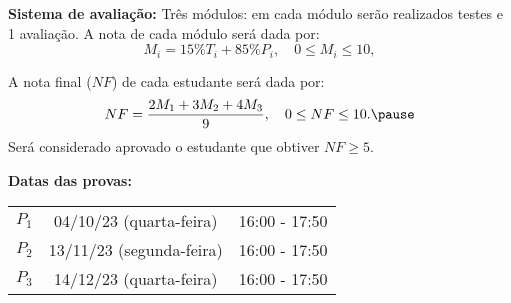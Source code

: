 \documentclass{beamer}
\begin{document}
    \begin{frame}
        {\bf{Sistema de avaliação:}} Três módulos: em cada módulo serão realizados testes e 1 avaliação.\pause
        A nota de cada módulo será dada por:
        \[
            M_i = 15\%T_i + 85\%P_i, \quad 0 \le M_i \le 10,
        \]

        A nota final ($NF$) de cada estudante ser\'a dada por:\pause
        \[
            NF = \dfrac{2M_1 + 3M_2 + 4M_3}{9}, \quad 0 \le NF \le 10.\pause
        \]
        Ser\'a considerado aprovado o estudante que obtiver $NF \ge 5$.
    \end{frame}

    \begin{frame}
        {\bf Datas das provas:}
        \begin{center}
            \begin{tabular}{c|c|c}
                \hline\hline
                \hspace{0.5cm}{\bf Prova}\hspace{0.5cm} & \hspace{1cm}{\bf Data}\hspace{1cm} & \hspace{1cm}{\bf Hor\'{a}rio}\hspace{1cm} \\
                \hline\hline
                $P_1$ & 04/10/23 (quarta-feira) \phantom{x} & 16:00 - 17:50 \\
                \hline
                $P_2$ & 13/11/23 (segunda-feira) \phantom{x} & 16:00 - 17:50 \\
                \hline
                $P_3$ & 14/12/23 (quarta-feira) \phantom{x} & 16:00 - 17:50 \\
                \hline\hline
            \end{tabular}
        \end{center}
    \end{frame}
\end{document}

